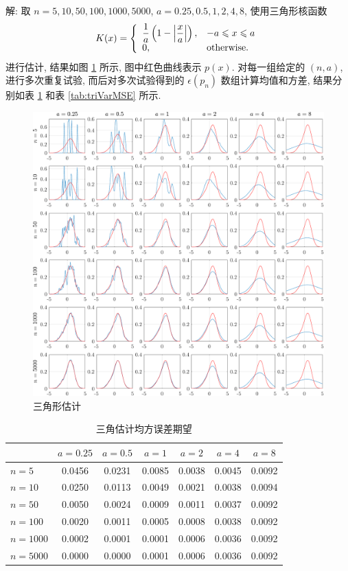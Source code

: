 \documentclass{article}
\begin{document}
解: 取 $n=5,10,50,100,1000,5000$, $a=0.25,0.5,1,2,4,8$, 使用三角形核函数
\begin{equation}
  K(x)=
  \left\{
    \begin{array}{ll}
      \dfrac{1}{a}\left(1-\left\lvert\dfrac{x}{a} \right\rvert\right),&-a\leqslant x\leqslant a \\
      0, & \text{otherwise.}
    \end{array}
  \right.
\end{equation}
进行估计, 结果如图 \ref{fig:triwin} 所示, 图中红色曲线表示 $p(x)$. 对每一组给定的 $(n,a)$, 进行多次重复试验, 而后对多次试验得到的 $\epsilon(p_n)$ 数组计算均值和方差, 结果分别如表 \ref{tab:triMeanMSE} 和表 \ref{tab:triVarMSE} 所示.

\begin{figure}[htbp]
  \centering
  \includegraphics[width=7in]{triangularWindow.pdf}
  \caption{三角形估计}
  \label{fig:triwin}
\end{figure}

\begin{table}[htbp]
  \centering
  \begin{tabular}{l|cccccc}
  \hline
           & $a=0.25$ & $a=0.5$ & $a=1$  & $a=2$  & $a=4$  & $a=8$  \\ \hline
  $n=5$    & 0.0456   & 0.0231  & 0.0085 & 0.0038 & 0.0045 & 0.0092 \\
  $n=10$   & 0.0250   & 0.0113  & 0.0049 & 0.0021 & 0.0038 & 0.0094 \\
  $n=50$   & 0.0050   & 0.0024  & 0.0009 & 0.0011 & 0.0037 & 0.0092 \\
  $n=100$  & 0.0020   & 0.0011  & 0.0005 & 0.0008 & 0.0038 & 0.0092 \\
  $n=1000$ & 0.0002   & 0.0001  & 0.0001 & 0.0006 & 0.0036 & 0.0092 \\
  $n=5000$ & 0.0000   & 0.0000  & 0.0001 & 0.0006 & 0.0036 & 0.0092 \\ \hline
  \end{tabular}
  \caption{三角估计均方误差期望}
  \label{tab:triMeanMSE}
\end{table}
\end{document}
